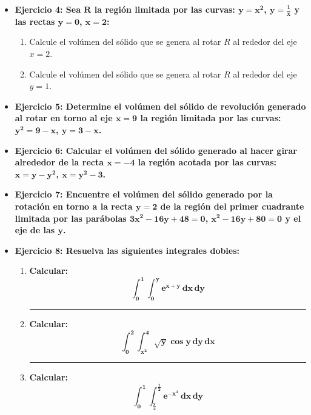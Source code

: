 \documentclass[12pt]{article}
\begin{document}
\begin{itemize}
        \item \textbf{Ejercicio 4: Sea $\bm{R}$ la región limitada por las curvas: $\bm{y = x^2}$, $\bm{y = \frac{1}{x}}$ y las rectas $\bm{y = 0}$, $\bm{x = 2}$:}
            \begin{enumerate}[label=\alph*)]
                \item Calcule el volúmen del sólido que se genera al rotar $R$ al rededor del eje $x = 2$.
                \item Calcule el volúmen del sólido que se genera al rotar $R$ al rededor del eje $y = 1$.
            \end{enumerate}
        
        
        \item \textbf{Ejercicio 5: Determine el volúmen del sólido de revolución generado al rotar en torno al eje $\bm{x = 9}$ la región limitada por las curvas: $\bm{y^2 = 9 - x}$, $\bm{y = 3 - x}$.}
        
        
        \item \textbf{Ejercicio 6: Calcular el volúmen del sólido generado al hacer girar alrededor de la recta $\bm{x = -4}$ la región acotada por las curvas: $\bm{x = y - y^2}$, $\bm{x = y^2 - 3}$.}
        
        
        \item \textbf{Ejercicio 7: Encuentre el volúmen del sólido generado por la rotación en torno a la recta $\bm{y = 2}$ de la región del primer cuadrante limitada por las parábolas $\bm{3x^2 - 16y + 48 = 0}$, $\bm{x^2 - 16y + 80 = 0}$ y el eje de las $\bm{y}$.}
        
        
        \item \textbf{Ejercicio 8: Resuelva las siguientes integrales dobles:} \vspace{0.5cm}
            \begin{enumerate}
                \hrule
                \item \textbf{Calcular:} \[\bm{\int_{0}^{1} \int_{0}^{y} e^{x + y} \, dx \, dy}\]
                

                \hrule
                \item \textbf{Calcular:} \[\bm{\int_{0}^{2} \int_{x^2}^{4} \sqrt{y} \cos{y} \, dy \, dx}\]
                

                \hrule
                \item \textbf{Calcular:} \[\bm{\int_{0}^{1} \int_{\frac{y}{2}}^{\frac{1}{2}} e^{-x^2} \, dx \, dy}\]
                


\end{enumerate}
\end{itemize}
\end{document}
